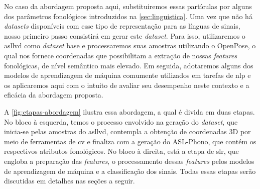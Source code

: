 No caso da abordagem proposta aqui, substituiremos essas partículas por alguns dos parâmetros fonológicos introduzidos na \autoref{sec:linguistica}. Uma vez que não há \textit{datasets} disponíveis com esse tipo de representação para as línguas de sinais, nosso primeiro passo consistirá em gerar este \textit{dataset}. Para isso, utilizaremos o \acrshort{asllvd} como \textit{dataset} base e processaremos suas amostras utilizando o OpenPose, o qual nos fornece coordenadas que possibilitam a extração de nossas \textit{features} fonológicas, de nível semântico mais elevado.
Em seguida, adotaremos alguns dos modelos de aprendizagem de máquina comumente utilizados em tarefas de \acrshort{nlp} e os aplicaremos aqui com o intuito de avaliar seu desempenho neste contexto e a eficácia da abordagem proposta. 













A \autoref{fig:etapas-abordagem} ilustra essa abordagem, a qual é divida em duas etapas.
No bloco à esquerda, temos o processo envolvido na geração do \textit{dataset}, que inicia-se pelas amostras do \acrshort{asllvd}, contempla a obtenção de coordenadas 3D por meio de ferramentas de \acrshort{cv} e finaliza com a geração do ASL-Phono, que contém os respectivos atributos fonológicos.
No bloco à direita, está a etapa de \acrlong{slr}, que engloba a preparação das \textit{features}, o processamento dessas \textit{features} pelos modelos de aprendizagem de máquina e a classificação dos sinais.
Todas essas etapas serão discutidas em detalhes nas seções a seguir.

